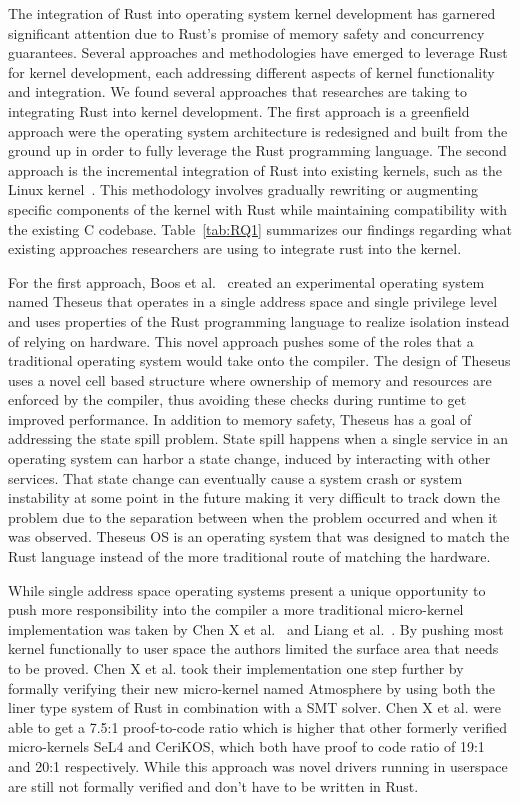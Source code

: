 \documentclass[sigconf]{acmart}
\begin{document}
The integration of Rust into operating system kernel development has garnered significant attention
due to Rust's promise of memory safety and concurrency guarantees. Several approaches and
methodologies have emerged to leverage Rust for kernel development, each addressing different
aspects of kernel functionality and integration.  We found several approaches that researches are
taking to integrating Rust into kernel development.  The first approach is a greenfield approach
were the operating system architecture is redesigned and built from the ground up in order to fully
leverage the Rust programming language. The second approach is the incremental integration of Rust
into existing kernels, such as the Linux
kernel~\cite{The_kernel_development_community_undated-iw}. This methodology involves gradually
rewriting or augmenting specific components of the kernel with Rust while maintaining compatibility
with the existing C codebase. Table~\ref{tab:RQ1} summarizes our findings regarding what existing
approaches researchers are using to integrate rust into the kernel.

For the first approach, Boos et al.~\cite{Boos2020-zh} created an experimental operating system
named Theseus that operates in a single address space and single privilege level and uses properties
of the Rust programming language to realize isolation instead of relying on hardware. This novel
approach pushes some of the roles that a traditional operating system would take onto the
compiler. The design of Theseus uses a novel cell based structure where ownership of memory and
resources are enforced by the compiler, thus avoiding these checks during runtime to get improved
performance. In addition to memory safety, Theseus has a goal of addressing the state spill
problem. State spill happens when a single service in an operating system can harbor a state change,
induced by interacting with other services. That state change can eventually cause a system crash or
system instability at some point in the future making it very difficult to track down the problem
due to the separation between when the problem occurred and when it was observed. Theseus OS is an
operating system that was designed to match the Rust language instead of the more traditional route
of matching the hardware.

While single address space operating systems present a unique opportunity to push more
responsibility into the compiler a more traditional micro-kernel implementation was taken by Chen X
et al.~\cite{Chen2023-wb} and Liang et al.~\cite{Liang2021-bo}. By pushing most kernel functionally
to user space the authors limited the surface area that needs to be proved. Chen X et al. took
their implementation one step further by formally verifying their new micro-kernel named Atmosphere
by using both the liner type system of Rust in combination with a SMT solver. Chen X et al. were
able to get a 7.5:1 proof-to-code ratio which is higher that other formerly verified micro-kernels
SeL4 and CeriKOS, which both have proof to code ratio of 19:1 and 20:1 respectively. While this
approach was novel drivers running in userspace are still not formally verified and don't have to be
written in Rust.
\end{document}
